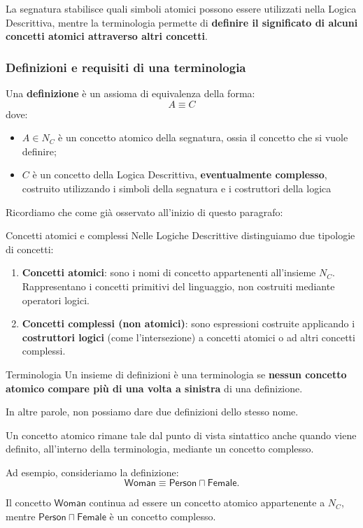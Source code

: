 La segnatura stabilisce quali simboli atomici possono essere
utilizzati nella Logica Descrittiva, mentre la terminologia
permette di \textbf{definire il significato di alcuni concetti atomici
attraverso altri concetti}.

\subsubsection{Definizioni e requisiti di una terminologia}

Una \textbf{definizione} è un assioma di equivalenza della forma:
\[
    A \equiv C
\]
dove:
\begin{itemize}
    \item $A \in N_C$ è un concetto atomico della segnatura,
    ossia il concetto che si vuole definire;
    \item $C$ è un concetto della Logica Descrittiva,
    \textbf{eventualmente complesso}, costruito utilizzando i simboli
    della segnatura e i costruttori della logica
\end{itemize}
Ricordiamo che come già osservato all'inizio di questo paragrafo:
\begin{observation}{Concetti atomici e complessi}
    Nelle Logiche Descrittive distinguiamo due tipologie
    di concetti:
    \begin{enumerate}
        \item \textbf{Concetti atomici}: sono i nomi di
        concetto appartenenti all'insieme $N_C$.
        Rappresentano i concetti primitivi del linguaggio,
        non costruiti mediante operatori logici.

        \item \textbf{Concetti complessi (non atomici)}:
        sono espressioni costruite applicando i
        \textbf{costruttori logici} (come l'intersezione) a concetti atomici
        o ad altri concetti complessi.
    \end{enumerate}
\end{observation}


\begin{definition}{Terminologia}
    Un insieme di definizioni è una terminologia se \textbf{nessun concetto atomico compare più
    di una volta a sinistra} di una definizione.

    In altre parole, non possiamo dare due definizioni dello stesso nome.
\end{definition}

\begin{observation}{}
    Un concetto atomico rimane tale dal punto di vista
    sintattico anche quando viene definito, all'interno
    della terminologia, mediante un concetto complesso.

    Ad esempio, consideriamo la definizione:
    \[
        \mathsf{Woman} \equiv
        \mathsf{Person} \sqcap \mathsf{Female}.
    \]

    Il concetto $\mathsf{Woman}$ continua ad essere un
    concetto atomico appartenente a $N_C$, mentre
    $\mathsf{Person} \sqcap \mathsf{Female}$ è un concetto
    complesso.
\end{observation}

